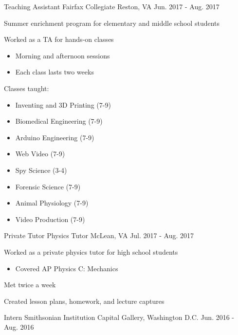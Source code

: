 \begin{cventries}
    \cventry
    {Teaching Assistant}
    {Fairfax Collegiate}
    {Reston, VA}
    {Jun. 2017 - Aug. 2017}
    {
		\begin{cvitems}
		\item{Summer enrichment program for elementary and middle school students}
		\item{Worked as a TA for hands-on classes}
		\begin{itemize}
			\item Morning and afternoon sessions
			\item Each class lasts two weeks
		\end{itemize}
		\item{Classes taught:}
		\vspace{-1em}
		\begin{multicols}{2}
			\begin{itemize}
				\item Inventing and 3D Printing (7-9)
				\item Biomedical Engineering (7-9)
				\item Arduino Engineering (7-9)
				\item Web Video (7-9)
				\item Spy Science (3-4)
				\item Forensic Science (7-9)
				\item Animal Physiology (7-9)
				\item Video Production (7-9)
			\end{itemize}
		\end{multicols}
		\end{cvitems}
	}
	\cventry
	{Private Tutor}
	{Physics Tutor}
	{McLean, VA}
	{Jul. 2017 - Aug. 2017}
	{
		\begin{cvitems}
		\item{Worked as a private physics tutor for high school students}
			\begin{itemize}
				\item Covered AP Physics C: Mechanics
			\end{itemize}
		\item{Met twice a week}
		\item{Created lesson plans, homework, and lecture captures}
		\end{cvitems}
	}
    \cventry
    {Intern}
    {Smithsonian Institution}
    {Capital Gallery, Washington D.C.}
    {Jun. 2016 - Aug. 2016}
    {
        \begin{cvitems}

\end{cvitems}}
\end{cventries}
